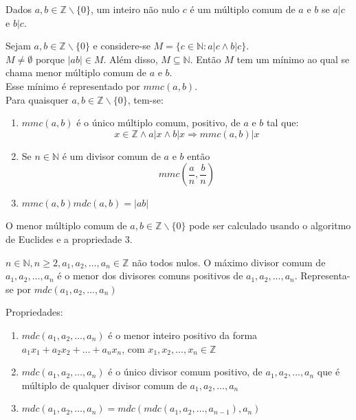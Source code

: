 \begin{definicao} Dados $a,b \in \mathbb{Z}\backslash \{0\}$, um inteiro não nulo $c$ é um múltiplo comum de $a$ e $b$ se $a|c$ e $b|c$.
\end{definicao}

Sejam $a,b \in \mathbb{Z}\backslash \{0\}$ e considere-se $M=\{c \in \mathbb{N}:a|c \land b|c\}$.\\

$M \neq \emptyset$ porque $|ab| \in M$. Além disso, $M \subseteq \mathbb{N}$. Então $M$ tem um mínimo ao qual se chama menor múltiplo comum de $a$ e $b$.\\
Esse mínimo é representado por $mmc(a,b).$\\

Para quaisquer $a,b \in \mathbb{Z} \backslash \{0\}$, tem-se:
\begin{enumerate}
    \item $mmc(a,b)$ é o único múltiplo comum, positivo, de $a$ e $b$ tal que:$$x \in \mathbb{Z} \land a|x \land b|x \Rightarrow mmc(a,b)|x$$
    \item Se $n \in \mathbb{N}$ é um divisor comum de $a$ e $b$ então
    $$mmc\left(\frac{a}{n},\frac{b}{n}\right)$$
    \item $mmc(a,b)mdc(a,b)=|ab|$
\end{enumerate}
O menor múltiplo comum de $a,b \in \mathbb{Z} \backslash \{0\}$ pode ser calculado usando o algoritmo de Euclides e a propriedade 3.\\

\begin{definicao} 
$n \in \mathbb{N},n \ge 2,a_1,a_2,\dotsc,a_n \in \mathbb{Z}$ não todos nulos. O máximo divisor comum de $a_1,a_2,\dotsc,a_n$ é o menor dos divisores comuns positivos de $a_1,a_2,...,a_n$. Representa-se por $mdc(a_1,a_2,\dotsc,a_n)$


Propriedades:
\begin{enumerate}
    \item $mdc(a_1,a_2,\dotsc,a_n)$ é o menor inteiro positivo da forma\\$a_1x_1+a_2x_2+\dotsc+a_nx_n$, com $x_1,x_2,\dotsc,x_n \in \mathbb{Z}$
    \item $mdc(a_1,a_2,\dotsc,a_n)$ é o único divisor comum positivo, de $a_1,a_2,\dotsc,a_n$ que é múltiplo de qualquer divisor comum de $a_1,a_2,\dotsc,a_n$
    \item $mdc(a_1,a_2,\dotsc,a_n)=mdc(mdc(a_1,a_2,\dotsc,a_{n-1}),a_n)$
\end{enumerate}
\end{definicao}


